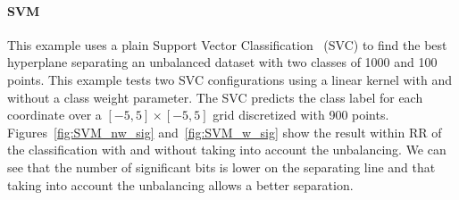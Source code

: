 \documentclass[11pt]{article}
\begin{document}


\paragraph{SVM}
This example uses a plain Support Vector Classification~\cite{Platt99probabilisticoutputs} (SVC) 
to find the best hyperplane separating an unbalanced dataset with two classes of 1000 and 100 points.
This example tests two SVC configurations using a linear kernel with and without a class weight parameter.
The SVC predicts the class label for each coordinate over a $[-5,5] \times [-5,5]$ grid discretized
with 900 points.
Figures~\ref{fig:SVM_nw_sig} and~\ref{fig:SVM_w_sig} show the result within RR of the classification with
and without taking into account the unbalancing.
We can see that the number of significant bits is lower on the separating line and
that taking into account the unbalancing allows a better separation.





\end{document}
